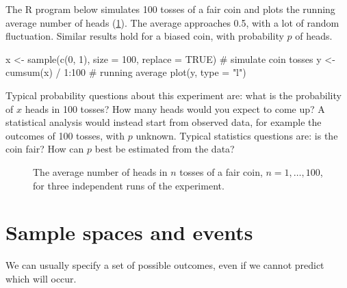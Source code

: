 \begin{example}\label{ex:coin-tossing-simulation}
The R program below simulates 100 tosses of a fair coin and plots the running average number of heads (\cref{fig:coin-running-average}). The average approaches 0.5, with a lot of random fluctuation. Similar results hold for a biased coin, with probability $p$ of heads.
\begin{rcode}
x <- sample(c(0, 1), size = 100, replace = TRUE)  # simulate coin tosses
y <- cumsum(x) / 1:100                            # running average
plot(y, type = "l")
\end{rcode}
Typical probability questions about this experiment are: what is the probability of $x$ heads in 100 tosses? How many heads would you expect to come up? A statistical analysis would instead start from observed data, for example the outcomes of 100 tosses, with $p$ unknown. Typical statistics questions are: is the coin fair? How can $p$ best be estimated from the data?
\end{example}

\begin{figure}[H]
\centering
{}
\caption{The average number of heads in $n$ tosses of a fair coin, $n = 1, \ldots, 100$, for three independent runs of the experiment.}
\label{fig:coin-running-average}
\end{figure}

\section{Sample spaces and events}\label{sec:sample-spaces-events}

We can usually specify a set of possible outcomes, even if we cannot predict which will occur.

